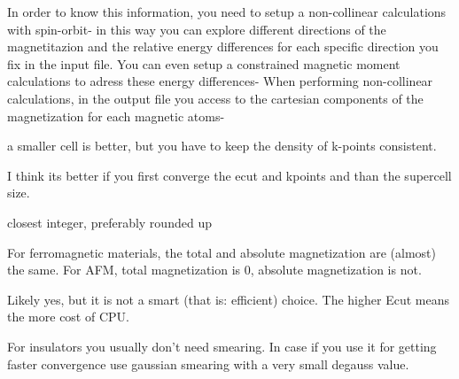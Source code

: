 
  In order to know this information, you need to setup a non-collinear calculations with spin-orbit-  in  this way you can explore different directions of the magnetitazion and
  the relative energy differences for each specific direction you fix in
  the input file.
  You can even setup a constrained magnetic moment calculations to adress these energy differences-
  When
  performing non-collinear calculations, in the output file you access to
  the cartesian components of the magnetization for each magnetic atoms-


  a smaller cell is better, but you have to keep the density of k-points consistent.

  I think its better if you first converge the  ecut and kpoints and than the supercell size.


  closest integer, preferably rounded up


  For ferromagnetic materials, the total and absolute magnetization are (almost) the same. For AFM, total magnetization is 0, absolute magnetization is not.


  Likely yes, but it is not a smart (that is: efficient) choice. The higher Ecut means the more cost of CPU.



  For insulators you usually don’t need smearing. In case if you use it for getting faster convergence use gaussian smearing with a very small degauss value.


